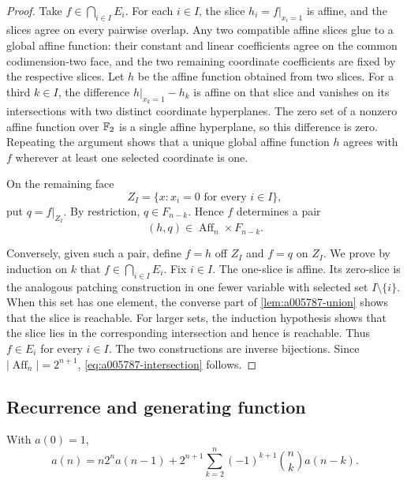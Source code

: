 \begin{proof}
Take \(f\in\bigcap_{i\in I}E_i\).  For each \(i\in I\), the slice
\(h_i=f|_{x_i=1}\) is affine, and the slices agree on every pairwise overlap.
Any two compatible affine slices glue to a global affine function: their
constant and linear coefficients agree on the common codimension-two face,
and the two remaining coordinate coefficients are fixed by the respective
slices.  Let \(h\) be the affine function obtained from two slices.  For a
third \(k\in I\), the difference
\(h|_{x_k=1}-h_k\) is affine on that slice and vanishes on its intersections
with two distinct coordinate hyperplanes.  The zero set of a nonzero affine
function over \(\mathbb{F}_2\) is a single affine hyperplane, so this difference is
zero.  Repeating the argument shows that a unique global affine function \(h\)
agrees with \(f\) wherever at least one selected coordinate is one.

On the remaining face
\[
 Z_I=\{x:x_i=0\text{ for every }i\in I\},
\]
put \(q=f|_{Z_I}\).  By restriction, \(q\in F_{n-k}\).  Hence \(f\) determines
a pair
\[
 (h,q)\in\operatorname{Aff}_n\times F_{n-k}.
\]

Conversely, given such a pair, define \(f=h\) off \(Z_I\) and \(f=q\) on
\(Z_I\).  We prove by induction on \(k\) that \(f\in\bigcap_{i\in I}E_i\).
Fix \(i\in I\).  The one-slice is affine.  Its zero-slice is the analogous
patching construction in one fewer variable with selected set
\(I\setminus\{i\}\).  When this set has one element, the converse part of
\cref{lem:a005787-union} shows that the slice is reachable.  For larger sets,
the induction hypothesis shows that the slice lies in the corresponding
intersection and hence is reachable.  Thus \(f\in E_i\) for every \(i\in I\).
The two constructions are inverse bijections.  Since
\(|\operatorname{Aff}_n|=2^{n+1}\), \cref{eq:a005787-intersection} follows.
\end{proof}

\subsection{Recurrence and generating function}

\begin{theorem}
\label{thm:a005787-recurrence}
With \(a(0)=1\),
\begin{equation}
 \boxed{
 a(n)=n2^n a(n-1)+2^{n+1}
 \sum_{k=2}^{n}(-1)^{k+1}\binom{n}{k}a(n-k).}
 \label{eq:a005787-recurrence}
\end{equation}
\end{theorem}

